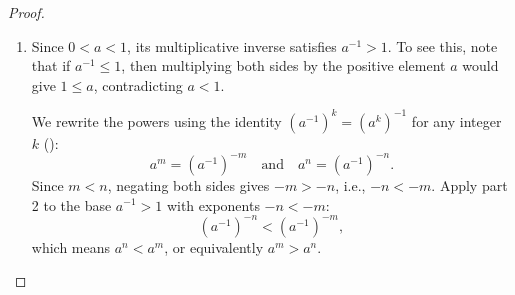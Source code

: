 \begin{proof}
\begin{enumerate}
    \item Since $0 < a < 1$, its multiplicative inverse satisfies $a^{-1} > 1$. To see this, note that if $a^{-1} \leq 1$, then multiplying both sides by the positive element $a$ would give $1 \leq a$, contradicting $a < 1$.

    We rewrite the powers using the identity $(a^{-1})^k = (a^k)^{-1}$ for any integer $k$ ():
    $$a^m = \left(a^{-1}\right)^{-m} \quad\text{and}\quad a^n = \left(a^{-1}\right)^{-n}.$$
    Since $m < n$, negating both sides gives $-m > -n$, i.e., $-n < -m$. Apply part 2 to the base $a^{-1} > 1$ with exponents $-n < -m$:
    $$\left(a^{-1}\right)^{-n} < \left(a^{-1}\right)^{-m},$$
    which means $a^n < a^m$, or equivalently $a^m > a^n$.
\end{enumerate}
\end{proof}
